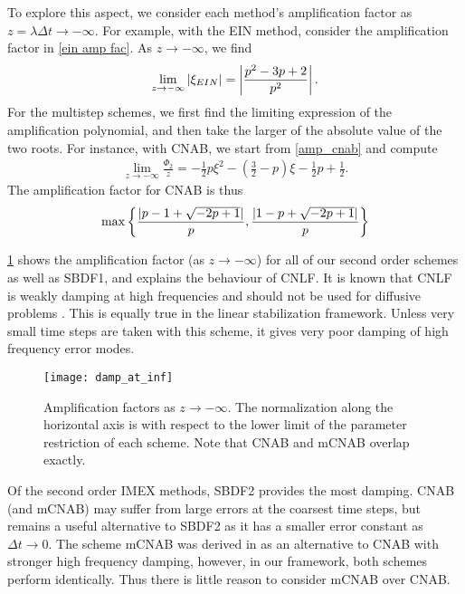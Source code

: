 To explore this aspect, we consider each method's amplification factor as $z=\lambda\Delta t \to -\infty$. For example, with the EIN method, consider the amplification factor in \cref{ein amp fac}. As $z\to -\infty$, we find 
\begin{align}
        \lim_{z\to-\infty} \left|\xi_{EIN}\right| = \left|\frac{p^2-3p+2}{p^2}\right|.
\end{align}
For the multistep schemes, we first find the limiting expression of the amplification polynomial, and then take the larger of the absolute value of the two roots. For instance, with CNAB, we start from \cref{amp_cnab} and compute
\begin{align}
        \lim_{z\to-\infty} \frac{\Phi_2}{z}
= -\frac{1}{2}p\xi^2-\left(\frac{3}{2}-p\right)\xi-\frac{1}{2}p+\frac{1}{2}.
\end{align}
The amplification factor for CNAB is thus 
\begin{align}
\max\left\{ \frac{\left|p-1+\sqrt{-2p+1}\right|}{p}, \frac{\left|1-p+\sqrt{-2p+1}\right|}{p}\right\}
\end{align}

\cref{fig:damp fac at inf} shows the amplification factor (as $z\to-\infty$) for all of our second order schemes as well as SBDF1, and explains the behaviour of CNLF. It is known that CNLF is weakly damping at high frequencies and should not be used for diffusive problems \cite{ascher1995implicit}. This is equally true in the linear stabilization framework. Unless very small time steps are taken with this scheme, it gives very poor damping of high frequency error modes.

\begin{figure}[htb!]
	\centering 
\texttt{[image: damp\_at\_inf]}
\caption[Amplification factors as $z\to-\infty$]{Amplification factors as $z\to-\infty$. The normalization along the horizontal axis is with respect to the lower limit of the parameter restriction of each scheme. Note that CNAB and mCNAB overlap exactly.}
\label{fig:damp fac at inf}
\end{figure}

Of the second order IMEX methods, SBDF2 provides the most damping. CNAB (and mCNAB) may suffer from large errors at the coarsest time steps, but remains a useful alternative to SBDF2 as it has a smaller error constant as $\Delta t\to 0$. The scheme mCNAB was derived in \cite{ascher1995implicit} as an alternative to CNAB with stronger high frequency damping, however, in our framework, both schemes perform identically. Thus there is little reason to consider mCNAB over CNAB.

